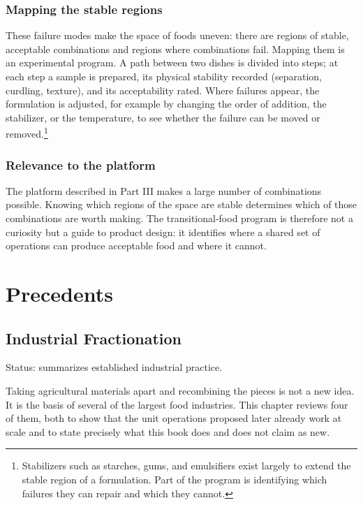 \documentclass[11pt,openany]{book}
\theoremstyle{definition}
\begin{document}
\section{Mapping the stable regions}

These failure modes make the space of foods uneven: there are regions of stable, acceptable combinations and regions where combinations fail. Mapping them is an experimental program. A path between two dishes is divided into steps; at each step a sample is prepared, its physical stability recorded (separation, curdling, texture), and its acceptability rated. Where failures appear, the formulation is adjusted, for example by changing the order of addition, the stabilizer, or the temperature, to see whether the failure can be moved or removed.\footnote{Stabilizers such as starches, gums, and emulsifiers exist largely to extend the stable region of a formulation. Part of the program is identifying which failures they can repair and which they cannot.}

\section{Relevance to the platform}

The platform described in Part III makes a large number of combinations possible. Knowing which regions of the space are stable determines which of those combinations are worth making. The transitional-food program is therefore not a curiosity but a guide to product design: it identifies where a shared set of operations can produce acceptable food and where it cannot.

\part{Precedents}

\chapter{Industrial Fractionation}\label{ch:industrial}

Status: summarizes established industrial practice.

Taking agricultural materials apart and recombining the pieces is not a new idea. It is the basis of several of the largest food industries. This chapter reviews four of them, both to show that the unit operations proposed later already work at scale and to state precisely what this book does and does not claim as new.
\end{document}
